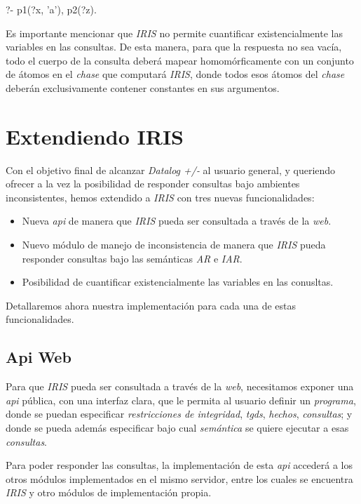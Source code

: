 \documentclass[11pt,a4paper,twoside]{tesis}
\begin{document}
\begin{center}
    ?- p1(?x, 'a'), p2(?z).
\end{center} 

Es importante mencionar que \textit{IRIS} no permite cuantificar existencialmente las variables en las consultas. De esta manera, para que la respuesta no sea vacía, todo el cuerpo de la consulta deberá mapear homomórficamente con un conjunto de átomos en el \textit{chase} que computará \textit{IRIS}, donde todos esos átomos del \textit{chase} deberán exclusivamente contener constantes en sus argumentos.

\section{Extendiendo IRIS}
Con el objetivo final de alcanzar \textit{Datalog +/-} al usuario general, y queriendo ofrecer a la vez la posibilidad de responder consultas bajo ambientes inconsistentes, hemos extendido a \textit{IRIS} con tres nuevas funcionalidades:

\begin{itemize}
    \item Nueva \textit{api} de manera que \textit{IRIS} pueda ser consultada a través de la \textit{web}.
    \item Nuevo módulo de manejo de inconsistencia de manera que \textit{IRIS} pueda responder consultas bajo las semánticas \textit{AR} e \textit{IAR}.
    \item Posibilidad de cuantificar existencialmente las variables en las conusltas.
\end{itemize}

Detallaremos ahora nuestra implementación para cada una de estas funcionalidades.

\subsection{Api Web}

Para que \textit{IRIS} pueda ser consultada a través de la \textit{web}, necesitamos exponer una \textit{api} pública, con una interfaz clara, que le permita al usuario definir un \textit{programa}, donde se puedan especificar \textit{restricciones de integridad}, \textit{tgds}, \textit{hechos}, \textit{consultas}; y donde se pueda además especificar bajo cual \textit{semántica} se quiere ejecutar a esas \textit{consultas}.

Para poder responder las consultas, la implementación de esta \textit{api} accederá a los otros módulos implementados en el mismo servidor,  entre los cuales se encuentra \textit{IRIS} y otro módulos de implementación propia.
\end{document}
